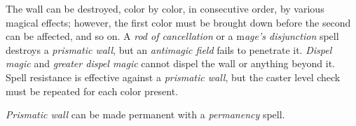\documentclass{article}
\begin{document}
The wall can be destroyed, color by color, in consecutive order, by various magical 
effects; however, the first color must be brought down before the second can be 
affected, and so on. A \textit{rod of cancellation }or a m\textit{age's disjunction 
}spell destroys a \textit{prismatic wall}, but an \textit{antimagic field }fails 
to penetrate it. \textit{Dispel magic }and \textit{greater dispel magic }cannot 
dispel the wall or anything beyond it. Spell resistance is effective against a 
\textit{prismatic wall}, but the caster level check must be repeated for each color 
present.

\textit{Prismatic wall }can be made permanent with a \textit{permanency }spell.

\begin{tabular}{|>{\raggedright}p{33pt}|>{\raggedright}p{29pt}|>{\raggedright}p{184pt}|>{\raggedright}p{55pt}|}
\hline

\end{tabular}
\end{document}
